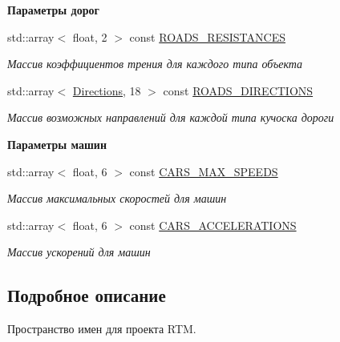 \begin{Indent}\textbf{ Параметры дорог}\par
\begin{DoxyCompactItemize}
\item 
std\+::array$<$ float, 2 $>$ const \hyperlink{namespacertm_a9f4d245ca5d201a5853914c175d0d17f}{R\+O\+A\+D\+S\+\_\+\+R\+E\+S\+I\+S\+T\+A\+N\+C\+ES}
\begin{DoxyCompactList}\small\item\em Массив коэффициентов трения для каждого типа объекта \end{DoxyCompactList}\item 
std\+::array$<$ \hyperlink{namespacertm_a4776fbfe59834ff1a16838ad6735b69a}{Directions}, 18 $>$ const \hyperlink{namespacertm_a5820286728bf347e0320bdd9dc91ed1b}{R\+O\+A\+D\+S\+\_\+\+D\+I\+R\+E\+C\+T\+I\+O\+NS}
\begin{DoxyCompactList}\small\item\em Массив возможных направлений для каждой типа кучоска дороги \end{DoxyCompactList}\end{DoxyCompactItemize}
\end{Indent}
\begin{Indent}\textbf{ Параметры машин}\par
\begin{DoxyCompactItemize}
\item 
std\+::array$<$ float, 6 $>$ const \hyperlink{namespacertm_ab4d4feaa707f2d1eba41feae3b46451f}{C\+A\+R\+S\+\_\+\+M\+A\+X\+\_\+\+S\+P\+E\+E\+DS}
\begin{DoxyCompactList}\small\item\em Массив максимальных скоростей для машин \end{DoxyCompactList}\item 
std\+::array$<$ float, 6 $>$ const \hyperlink{namespacertm_acac83b872b644793530e7f6f4660c85e}{C\+A\+R\+S\+\_\+\+A\+C\+C\+E\+L\+E\+R\+A\+T\+I\+O\+NS}
\begin{DoxyCompactList}\small\item\em Массив ускорений для машин \end{DoxyCompactList}\end{DoxyCompactItemize}
\end{Indent}


\subsection{Подробное описание}
Пространство имен для проекта R\+TM. 

